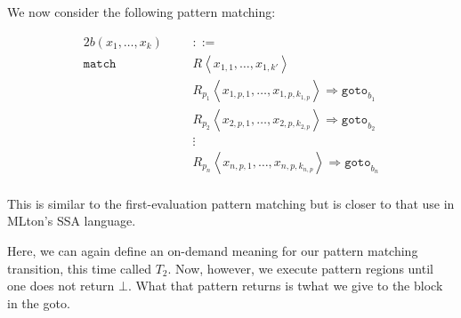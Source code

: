 \documentclass{article}
\begin{document}
We now consider the following pattern matching:

\begin{alignat*}{2}
b(x_1, \dots, x_k) &&&::=  \\
\texttt{match} \, &&& R \left\langle x_{1,1}, \dots, x_{1,k'} \right\rangle \\
    & && R_{p_1} \left\langle x_{1,p,1}, \dots, x_{1,p,k_{1,p}} \right\rangle \Rightarrow \texttt{goto}_{b_1} \\
    & && R_{p_2} \left\langle x_{2,p,1}, \dots, x_{2,p,k_{2,p}} \right\rangle \Rightarrow \texttt{goto}_{b_2} \\
    & &&\vdots \\
    & && R_{p_n} \left\langle x_{n,p,1}, \dots, x_{n,p,k_{n,p}} \right\rangle \Rightarrow \texttt{goto}_{b_n} \\
\end{alignat*}


This is similar to the first-evaluation pattern matching but is closer to that use in MLton's SSA language.

Here, we can again define an on-demand meaning for our pattern matching transition, this time called $T_2$. Now, however, we execute pattern regions until one does not return $\bot$. What that pattern returns is twhat we give to the block in the goto.




\end{document}
